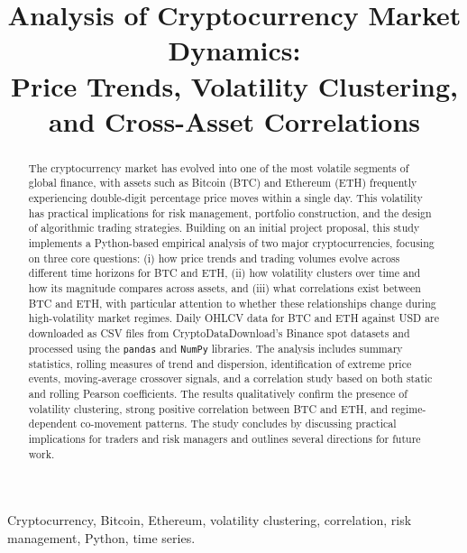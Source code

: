\documentclass[conference]{IEEEtran}
\begin{document}
\title{Analysis of Cryptocurrency Market Dynamics: \\
Price Trends, Volatility Clustering, and Cross-Asset Correlations}

\author{
}

\maketitle

\begin{abstract}
The cryptocurrency market has evolved into one of the most volatile segments of global finance, with assets such as Bitcoin (BTC) and Ethereum (ETH) frequently experiencing double-digit percentage price moves within a single day. This volatility has practical implications for risk management, portfolio construction, and the design of algorithmic trading strategies. Building on an initial project proposal, this study implements a Python-based empirical analysis of two major cryptocurrencies, focusing on three core questions: (i) how price trends and trading volumes evolve across different time horizons for BTC and ETH, (ii) how volatility clusters over time and how its magnitude compares across assets, and (iii) what correlations exist between BTC and ETH, with particular attention to whether these relationships change during high-volatility market regimes. Daily OHLCV data for BTC and ETH against USD are downloaded as CSV files from CryptoDataDownload's Binance spot datasets and processed using the \texttt{pandas} and \texttt{NumPy} libraries. The analysis includes summary statistics, rolling measures of trend and dispersion, identification of extreme price events, moving-average crossover signals, and a correlation study based on both static and rolling Pearson coefficients. The results qualitatively confirm the presence of volatility clustering, strong positive correlation between BTC and ETH, and regime-dependent co-movement patterns. The study concludes by discussing practical implications for traders and risk managers and outlines several directions for future work.
\end{abstract}

\begin{IEEEkeywords}
Cryptocurrency, Bitcoin, Ethereum, volatility clustering, correlation, risk management, Python, time series.
\end{IEEEkeywords}
\end{document}
